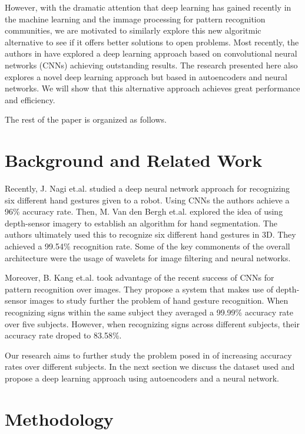 \documentclass[a4paper]{article}
\begin{document}
However, with the dramatic attention that deep learning has gained recently 
in the machine learning and the immage processing for pattern recognition
communities, we are motivated to similarly explore this new algoritmic
alternative to see if it offers better solutions to open problems. Most
recently, the authors in \cite{kang2015real} have explored a deep learning
approach based on convolutional neural networks (CNNs) achieving outstanding
results. The research presented here also explores a novel deep learning
approach but based in autoencoders and neural networks. We will show that this
alternative approach achieves great performance and efficiency.

The rest of the paper is organized as follows. 


\section{Background and Related Work}

Recently, J. Nagi et.al. \cite{nagi2011max} studied a deep neural network
approach for recognizing six different hand gestures given to a robot. Using
CNNs the authors achieve a 96\% accuracy rate. Then, M. Van den Bergh et.al.
\cite{van2011combining} explored the idea of using depth-sensor imagery to
establish an algorithm for hand segmentation. The authors ultimately used this
to recognize six different hand gestures in 3D. They achieved a 99.54\%
recognition rate. Some of the key commonents of the overall architecture were
the usage of wavelets for image filtering and neural networks.

Moreover, B. Kang et.al. \cite{kang2015real} took advantage of the recent
success of CNNs for pattern recognition over images. They propose a system that
makes use of depth-sensor images to study further the problem of hand gesture
recognition. When recognizing signs within the same subject they averaged a 99.99\%
accuracy rate over five subjects. However, when recognizing signs across
different subjects, their accuracy rate droped to 83.58\%. 

Our research aims to further study the problem posed in \cite{kang2015real} of
increasing accuracy rates over different subjects. In the next section we
discuss the dataset used and propose a deep learning approach using
autoencoders and a neural network. 


\section{Methodology}
\end{document}
